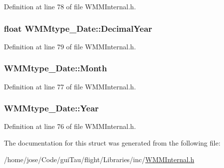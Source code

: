 Definition at line 78 of file W\-M\-M\-Internal.\-h.

\hypertarget{struct_w_m_mtype___date_a68078d5d0181333dcf11e24171a218f2}{
\subsubsection[{Decimal\-Year}]{\setlength{\rightskip}{0pt plus 5cm}float W\-M\-Mtype\-\_\-\-Date\-::\-Decimal\-Year}}\label{struct_w_m_mtype___date_a68078d5d0181333dcf11e24171a218f2}


Definition at line 79 of file W\-M\-M\-Internal.\-h.

\hypertarget{struct_w_m_mtype___date_a7f47a103df8618aac10b109fd5b149c4}{
\subsubsection[{Month}]{ W\-M\-Mtype\-\_\-\-Date\-::\-Month}}\label{struct_w_m_mtype___date_a7f47a103df8618aac10b109fd5b149c4}


Definition at line 77 of file W\-M\-M\-Internal.\-h.

\hypertarget{struct_w_m_mtype___date_a82ccdb4608f69fe13225f5add055d3ad}{
\subsubsection[{Year}]{ W\-M\-Mtype\-\_\-\-Date\-::\-Year}}\label{struct_w_m_mtype___date_a82ccdb4608f69fe13225f5add055d3ad}


Definition at line 76 of file W\-M\-M\-Internal.\-h.



The documentation for this struct was generated from the following file\-:\begin{DoxyCompactItemize}
\item 
/home/jose/\-Code/gui\-Tau/flight/\-Libraries/inc/\hyperlink{_w_m_m_internal_8h}{W\-M\-M\-Internal.\-h}\end{DoxyCompactItemize}
